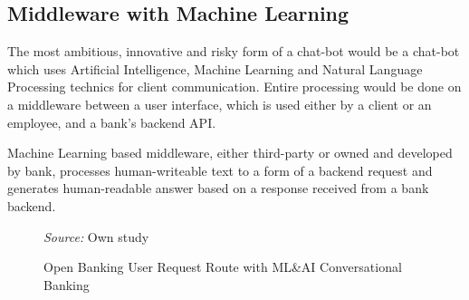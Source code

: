 \subsection{Middleware with Machine Learning}

The most ambitious, innovative and risky form of a chat-bot would be a chat-bot which uses Artificial Intelligence, Machine Learning and Natural Language Processing technics for client communication.
Entire processing would be done on a middleware between a user interface, which is used either by a client or an employee, and a bank's backend API.

Machine Learning based middleware, either third-party or owned and developed by bank, processes human-writeable text to a form of a backend request and generates human-readable answer based on a response received from a bank backend.

\begin{figure}
    \centering
    \caption{Open Banking User Request Route with ML\&AI Conversational Banking}
    \medskip
    \footnotesize\textit{Source:} Own study
\end{figure}

